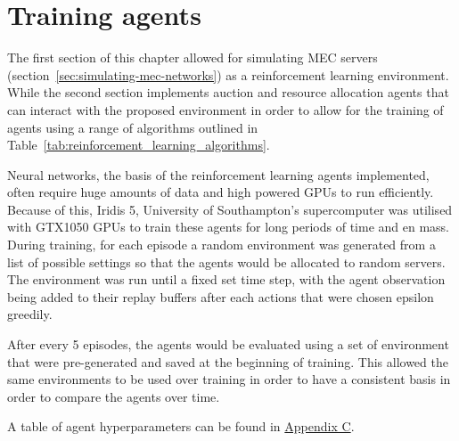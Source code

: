 \section{Training agents}\label{sec:training-agents}
The first section of this chapter allowed for simulating MEC servers
(section~\ref{sec:simulating-mec-networks}) as a reinforcement learning environment. While the second
section implements auction and resource allocation agents that can interact with the proposed environment in order
to allow for the training of agents using a range of algorithms outlined in
Table~\ref{tab:reinforcement_learning_algorithms}.

Neural networks, the basis of the reinforcement learning agents implemented, often require huge amounts of data and
high powered GPUs to run efficiently. Because of this, Iridis 5, University of Southampton's supercomputer was utilised
with GTX1050 GPUs to train these agents for long periods of time and en mass. During training, for each episode a
random environment was generated from a list of possible settings so that the agents would be allocated to random
servers. The environment was run until a fixed set time step, with the agent observation being added to their replay
buffers after each actions that were chosen epsilon greedily.

After every 5 episodes, the agents would be evaluated using a set of environment that were pre-generated and
saved at the beginning of training. This allowed the same environments to be used over training in order to have a
consistent basis in order to compare the agents over time.

A table of agent hyperparameters can be found in \hyperref[app:agent-hyperparameter]{Appendix C}.

